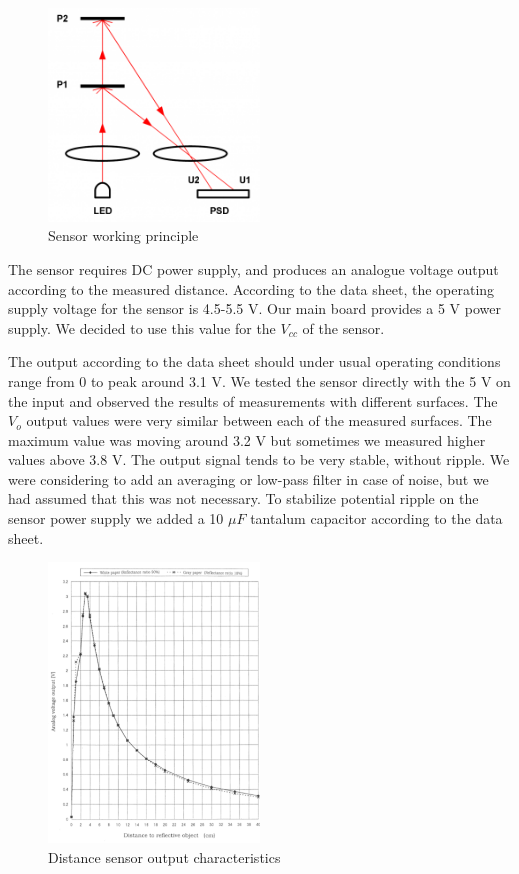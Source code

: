 \begin{figure}[!ht]
	\centering
	\includegraphics[width=0.5\textwidth]{figures/sensor_principle}
	\caption{Sensor working principle}
	\label{fig:sensorprinciple}
\end{figure}

The sensor requires DC power supply, and produces an analogue voltage output according to the measured distance. According to the data sheet, the operating supply voltage for the sensor is 4.5-5.5 V. Our main board provides a 5 V power supply. We decided to use this value for the $V_{cc}$ of the sensor.

The output according to the data sheet should under usual operating conditions range from 0 to peak around 3.1 V. 
We tested the sensor directly with the 5 V on the input and observed the results of measurements with different surfaces. The $V_{o}$ output values were very similar between each of the measured surfaces. The maximum value was moving around 3.2 V but sometimes we measured higher values above 3.8 V. The output signal tends to be very stable, without ripple. We were considering to add an averaging or low-pass filter in case of noise, but we had assumed that this was not necessary. To stabilize potential ripple on the sensor power supply we added a 10 $\mu F$  tantalum capacitor according to the data sheet. 


\begin{figure}[!ht]
	\centering
	\includegraphics[width=0.5\textwidth]{figures/sensorchar}
	\caption{Distance sensor output characteristics }
	\label{fig:sensorchar}
\end{figure}


